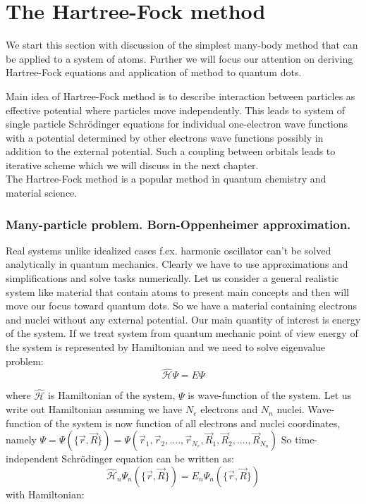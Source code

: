 \documentclass[10pt]{article}
\newcommand*{\hatH}{\hat{\mathcal{H}}}
\begin{document}
\section{The Hartree-Fock method }\label{Part1}   %

We start this section with discussion of the simplest many-body method that can be applied to a system of atoms. Further we will focus our attention on deriving Hartree-Fock equations and application of method to quantum dots.

Main idea of Hartree-Fock method is to describe interaction between particles as effective potential where particles move independently. This leads to system of single particle Schr\"{o}dinger equations for individual one-electron wave functions with a potential determined by other electrons wave functions possibly in addition to the external potential. Such a coupling between orbitals leads to iterative scheme which we will discuss in the next chapter. \\
  The Hartree-Fock method is a popular method in quantum chemistry and material science. 



\subsubsection{Many-particle problem. Born-Oppenheimer approximation.}

Real systems unlike idealized cases f.ex. harmonic oscillator can't be solved analytically in quantum mechanics.
Clearly we have to use approximations and simplifications and solve tasks numerically.
Let us consider a general realistic system like material that contain atoms to present main concepts and then will move our focus toward quantum dots.
So we have a material containing electrons and nuclei without any external potential.
Our main quantity of interest is energy of the system. If we treat system from quantum mechanic point of view energy of the system is represented by Hamiltonian and we need to solve eigenvalue problem:
\[
\hatH\Psi = E\Psi
\]

where $\hatH$ is Hamiltonian of the system, $\Psi$ is wave-function of the system.
Let us write out Hamiltonian assuming we have $N_e$ electrons and $N_n$ nuclei. Wave-function of the system is now function of all electrons and nuclei coordinates, namely $\Psi=\Psi(\{\vec{r}, \vec{R}\}) = \Psi(\vec{r}_1, \vec{r}_2, ...., \vec{r}_{N_e}, \vec{R}_1, \vec{R}_2, ...., \vec{R}_{N_n})$
So time-independent Schr\"{o}dinger equation can be written as:
\[
\hatH_n\Psi_n(\{\vec{r}, \vec{R}\}) = E_n\Psi_n(\{\vec{r}, \vec{R}\})
\]
with Hamiltonian:
\end{document}
